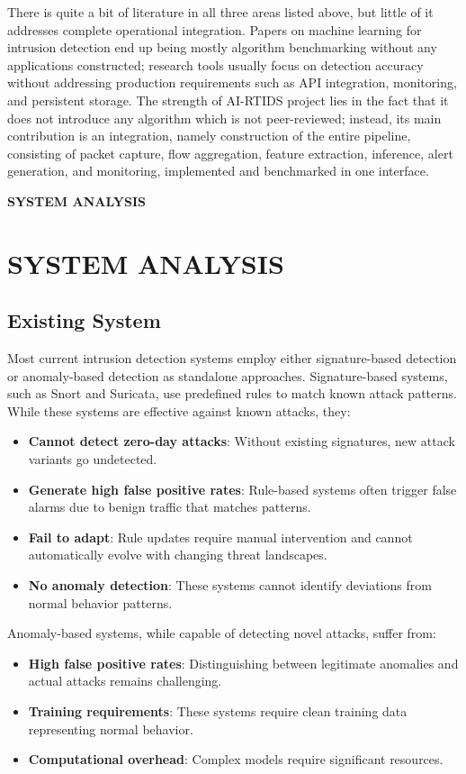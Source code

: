 \documentclass[12pt,a4paper]{report}
\newcommand{\chapterdivider}[1]{%
    \clearpage
    \thispagestyle{empty}
    \vspace*{\fill}
    \begin{center}
        \Huge\bfseries\color{mydarkblue} #1
    \end{center}
    \vspace*{\fill}
    \clearpage
}
\begin{document}
There is quite a bit of literature in all three areas listed above, but little of it addresses complete operational integration. Papers on machine learning for intrusion detection end up being mostly algorithm benchmarking without any applications constructed; research tools usually focus on detection accuracy without addressing production requirements such as API integration, monitoring, and persistent storage. The strength of AI-RTIDS project lies in the fact that it does not introduce any algorithm which is not peer-reviewed; instead, its main contribution is an integration, namely construction of the entire pipeline, consisting of packet capture, flow aggregation, feature extraction, inference, alert generation, and monitoring, implemented and benchmarked in one interface.

\chapterdivider{SYSTEM ANALYSIS}

\chapter{SYSTEM ANALYSIS}

\section{Existing System}

Most current intrusion detection systems employ either signature-based detection or anomaly-based detection as standalone approaches. Signature-based systems, such as Snort and Suricata, use predefined rules to match known attack patterns. While these systems are effective against known attacks, they:

\begin{itemize}
    \item \textbf{Cannot detect zero-day attacks}: Without existing signatures, new attack variants go undetected.
    \item \textbf{Generate high false positive rates}: Rule-based systems often trigger false alarms due to benign traffic that matches patterns.
    \item \textbf{Fail to adapt}: Rule updates require manual intervention and cannot automatically evolve with changing threat landscapes.
    \item \textbf{No anomaly detection}: These systems cannot identify deviations from normal behavior patterns.
\end{itemize}

Anomaly-based systems, while capable of detecting novel attacks, suffer from:
\begin{itemize}
    \item \textbf{High false positive rates}: Distinguishing between legitimate anomalies and actual attacks remains challenging.
    \item \textbf{Training requirements}: These systems require clean training data representing normal behavior.
    \item \textbf{Computational overhead}: Complex models require significant resources.
\end{itemize}
\end{document}
